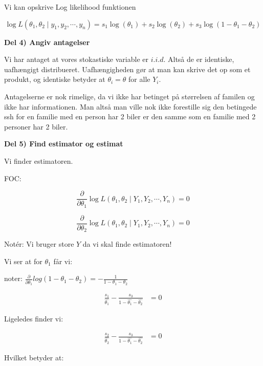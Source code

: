 Vi kan opskrive Log likelihood funktionen

\begin{equation}
   \log L (\theta_1, \theta_2 \mid y_1, y_2 , \cdots , y_{n}) = s_1 \log(\theta_1) + s_2 \log(\theta_2) + s_3 \log(1 -\theta_1 - \theta_2)
\end{equation}

\textbf{Del 4) Angiv antagelser}

Vi har antaget at vores stokastiske variable er $i.i.d$. Altså de er identiske, uafhængigt distribueret. Uafhængigheden gør at man kan skrive det op som et produkt, og identiske betyder at $\theta_i = \theta$ for alle $Y_i$.

Antagelserne er nok rimelige, da vi ikke har betinget på størrelsen af familen og ikke har informationen. Man altså man ville nok ikke forestille sig den betingede ssh for en familie med en person har 2 biler er den samme som en familie med 2 personer har 2 biler.

\textbf{Del 5) Find estimator og estimat}

Vi finder estimatoren.

FOC:

\begin{equation}
   \frac{\partial}{\partial \theta_1} \log L (\theta_1, \theta_2 \mid Y_1, Y_2 , \cdots , Y_{n}) = 0
\end{equation}


\begin{equation}
   \frac{\partial}{\partial \theta_2} \log L (\theta_1, \theta_2 \mid Y_1, Y_2 , \cdots , Y_{n}) = 0
\end{equation}

Notér: Vi bruger store $Y$ da vi skal finde estimatoren!

Vi ser at for $\theta_1$ får vi:

noter: $\frac{\partial}{\partial \theta_1} log(1 -\theta_1 - \theta_2) = - \frac{1}{1 -\theta_1 - \theta_2}$

\begin{align}
    \frac{s_1}{\hat{\theta_1}} - \frac{s_3}{1-\hat{\theta_1} - \hat{\theta_2}} &= 0
\end{align}

Ligeledes finder vi:

\begin{align}
    \frac{s_2}{\hat{\theta_2}} - \frac{s_3}{1-\hat{\theta_1} - \hat{\theta_2}} &= 0
\end{align}

Hvilket betyder at:

